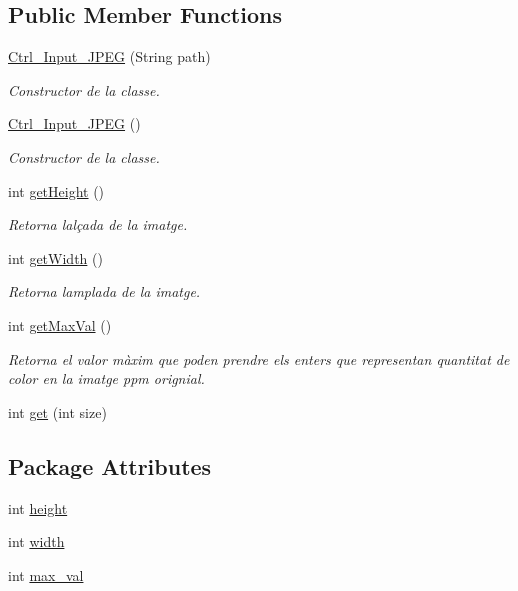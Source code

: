 \subsection*{Public Member Functions}
\begin{DoxyCompactItemize}
\item 
\hyperlink{classpersistencia_1_1input_1_1Ctrl__Input__JPEG_aa7d81dfa6240a7ee82e5188fc2600c58}{Ctrl\+\_\+\+Input\+\_\+\+J\+P\+EG} (String path)
\begin{DoxyCompactList}\small\item\em Constructor de la classe. \end{DoxyCompactList}\item 
\hyperlink{classpersistencia_1_1input_1_1Ctrl__Input__JPEG_a5c340483ee0fc78f985bd5d2ddcbb3a0}{Ctrl\+\_\+\+Input\+\_\+\+J\+P\+EG} ()
\begin{DoxyCompactList}\small\item\em Constructor de la classe. \end{DoxyCompactList}\item 
int \hyperlink{classpersistencia_1_1input_1_1Ctrl__Input__JPEG_a173716ac8d17365965ede95f99a8e65a}{get\+Height} ()
\begin{DoxyCompactList}\small\item\em Retorna l\textquotesingle{}alçada de la imatge. \end{DoxyCompactList}\item 
int \hyperlink{classpersistencia_1_1input_1_1Ctrl__Input__JPEG_ab4cd4c26db5bd1ce89f6e53458c99ba8}{get\+Width} ()
\begin{DoxyCompactList}\small\item\em Retorna l\textquotesingle{}amplada de la imatge. \end{DoxyCompactList}\item 
int \hyperlink{classpersistencia_1_1input_1_1Ctrl__Input__JPEG_a7c07d70b1dd3881e3322e9e3403e2ae7}{get\+Max\+Val} ()
\begin{DoxyCompactList}\small\item\em Retorna el valor màxim que poden prendre els enters que representan quantitat de color en la imatge ppm orignial. \end{DoxyCompactList}\item 
int \hyperlink{classpersistencia_1_1input_1_1Ctrl__Input__JPEG_a702b13d096ba57f06b242987f0dbf4ec}{get} (int size)
\end{DoxyCompactItemize}
\subsection*{Package Attributes}
\begin{DoxyCompactItemize}
\item 
int \hyperlink{classpersistencia_1_1input_1_1Ctrl__Input__JPEG_a9e6805b998e58981f8cd7b8b6e609f27}{height}
\item 
int \hyperlink{classpersistencia_1_1input_1_1Ctrl__Input__JPEG_a07d902b25b54941dc0444398c7d380e7}{width}
\item 
int \hyperlink{classpersistencia_1_1input_1_1Ctrl__Input__JPEG_a8720235be6a11ef90085217064bbb1b0}{max\+\_\+val}
\end{DoxyCompactItemize}
